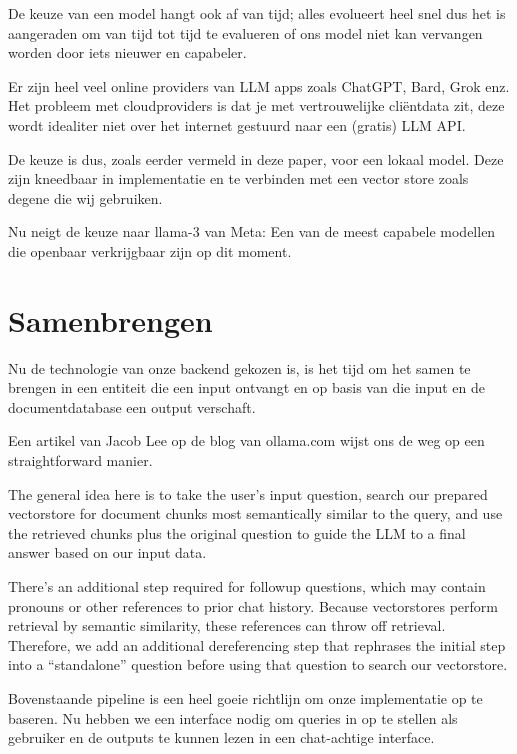 De keuze van een model hangt ook af van tijd; alles evolueert heel snel dus het is aangeraden om van tijd tot tijd te evalueren of ons model niet kan vervangen worden door iets nieuwer en capabeler.

Er zijn heel veel online providers van LLM apps zoals ChatGPT, Bard, Grok enz. 
Het probleem met cloudproviders is dat je met vertrouwelijke cliëntdata zit, deze wordt idealiter niet over het internet gestuurd naar een (gratis) LLM API. 

De keuze is dus, zoals eerder vermeld in deze paper, voor een lokaal model.
Deze zijn kneedbaar in implementatie en te verbinden met een vector store zoals degene die wij gebruiken. 


Nu neigt de keuze naar llama-3 van Meta: Een van de meest capabele modellen die openbaar verkrijgbaar zijn op dit moment.
\newpage
\section{Samenbrengen}
Nu de technologie van onze backend gekozen is, is het tijd om het samen te brengen in een entiteit die een input ontvangt en op basis van die input en de documentdatabase een output verschaft.

Een artikel van Jacob Lee op de blog van ollama.com wijst ons de weg op een straightforward manier.

\begin{displayquote}
	The general idea here is to take the user’s input question, search our prepared vectorstore for document chunks most semantically similar to the query,
	and use the retrieved chunks plus the original question to guide the LLM to a final answer based on our input data.

	There’s an additional step required for followup questions, which may contain pronouns or other references to prior chat history.
	Because vectorstores perform retrieval by semantic similarity, these references can throw off retrieval.
	Therefore, we add an additional dereferencing step that rephrases the initial step into a “standalone” question before using that question to search our vectorstore. 

	\begin{figure}[h]
	\end{figure}
	\autocite{Ollama}
\end{displayquote}

Bovenstaande pipeline is een heel goeie richtlijn om onze implementatie op te baseren. Nu hebben we een interface nodig om queries in op te stellen als gebruiker en de outputs te kunnen lezen in een chat-achtige interface. 
